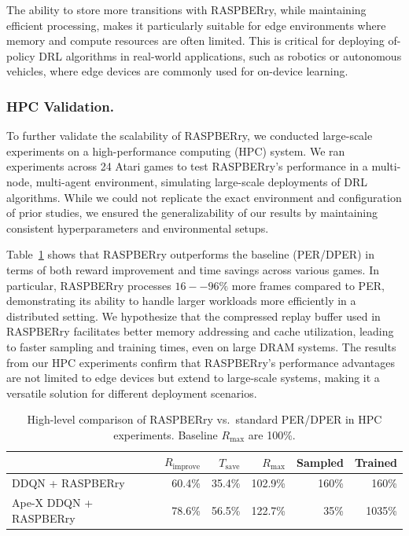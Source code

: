 \documentclass[10pt]{article} %
\begin{document}
The ability to store more transitions with RASPBERry, while maintaining efficient processing, makes it particularly suitable for edge environments where memory and compute resources are often limited.  
This is critical for deploying of-policy DRL algorithms in real-world applications, such as robotics or autonomous vehicles, where edge devices are commonly used for on-device learning.

\subsubsection{HPC Validation.}
To further validate the scalability of RASPBERry, we conducted large-scale experiments on a high-performance computing (HPC) system.
We ran experiments across 24 Atari games to test RASPBERry’s performance in a multi-node, multi-agent environment, simulating large-scale deployments of DRL algorithms.  
While we could not replicate the exact environment and configuration of prior studies, we ensured the generalizability of our results by maintaining consistent hyperparameters and environmental setups.

Table~\ref{tab:hpc_sum} shows that RASPBERry outperforms the baseline (PER/DPER) in terms of both reward improvement and time savings across various games.  
In particular, RASPBERry processes $16--96\%$ more frames compared to PER, demonstrating its ability to handle larger workloads more efficiently in a distributed setting.  
We hypothesize that the compressed replay buffer used in RASPBERry facilitates better memory addressing and cache utilization, leading to faster sampling and training times, even on large DRAM systems.
The results from our HPC experiments confirm that RASPBERry’s performance advantages are not limited to edge devices but extend to large-scale systems, making it a versatile solution for different deployment scenarios.  

\begin{table}[h]
\centering
\begin{tabular}{lrrrrr}
\toprule
 & $R_{\text{improve}}$ & $T_{\text{save}}$ & $R_{\text{max}}$ & \textbf{Sampled} & \textbf{Trained} \\
\midrule
DDQN + RASPBERry       &  60.4\% & 35.4\% & 102.9\% & 160\% & 160\% \\
Ape-X DDQN + RASPBERry &  78.6\% & 56.5\% & 122.7\% &  35\% & 1035\% \\
\bottomrule
\end{tabular}
\caption{High-level comparison of RASPBERry vs.\ standard PER/DPER in HPC experiments. Baseline $R_{\text{max}}$ are 100\%.}
\label{tab:hpc_sum}
\end{table}
\end{document}
